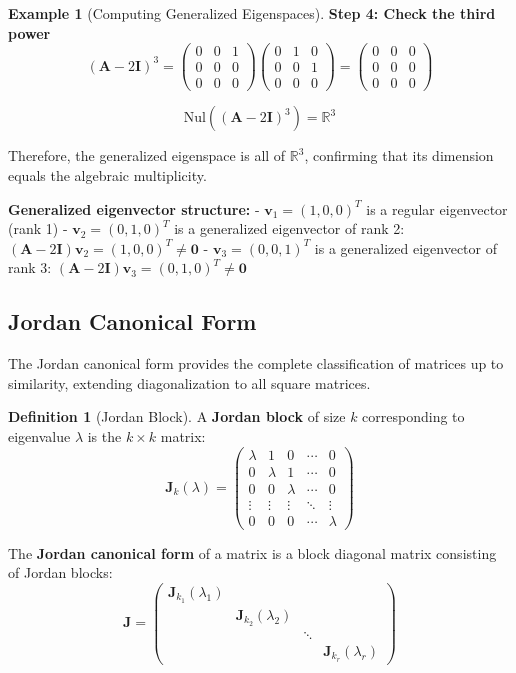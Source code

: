 \documentclass[12pt]{article}
\numberwithin{equation}{section}
\newcommand{\vect}[1]{\boldsymbol{#1}}   %
\newcommand{\mat}[1]{\mathbf{#1}}        %
\theoremstyle{plain}
\theoremstyle{definition}
\newtheorem{definition}[theorem]{Definition}
\newtheorem{example}[theorem]{Example}
\theoremstyle{remark}
\begin{document}
\begin{example}[Computing Generalized Eigenspaces]
\textbf{Step 4: Check the third power}
$$(\mat{A} - 2\mat{I})^3 = \begin{pmatrix} 0 & 0 & 1 \\ 0 & 0 & 0 \\ 0 & 0 & 0 \end{pmatrix}\begin{pmatrix} 0 & 1 & 0 \\ 0 & 0 & 1 \\ 0 & 0 & 0 \end{pmatrix} = \begin{pmatrix} 0 & 0 & 0 \\ 0 & 0 & 0 \\ 0 & 0 & 0 \end{pmatrix}$$

$$\text{Nul}((\mat{A} - 2\mat{I})^3) = \mathbb{R}^3$$

Therefore, the generalized eigenspace is all of $\mathbb{R}^3$, confirming that its dimension equals the algebraic multiplicity.

\textbf{Generalized eigenvector structure:}
- $\vect{v}_1 = (1, 0, 0)^T$ is a regular eigenvector (rank 1)
- $\vect{v}_2 = (0, 1, 0)^T$ is a generalized eigenvector of rank 2: $(\mat{A} - 2\mat{I})\vect{v}_2 = (1, 0, 0)^T \neq \vect{0}$
- $\vect{v}_3 = (0, 0, 1)^T$ is a generalized eigenvector of rank 3: $(\mat{A} - 2\mat{I})\vect{v}_3 = (0, 1, 0)^T \neq \vect{0}$
\end{example}

\subsection{Jordan Canonical Form}

The Jordan canonical form provides the complete classification of matrices up to similarity, extending diagonalization to all square matrices.

\begin{definition}[Jordan Block]
A \textbf{Jordan block} of size $k$ corresponding to eigenvalue $\lambda$ is the $k \times k$ matrix:
$$\mat{J}_k(\lambda) = \begin{pmatrix}
\lambda & 1 & 0 & \cdots & 0 \\
0 & \lambda & 1 & \cdots & 0 \\
0 & 0 & \lambda & \cdots & 0 \\
\vdots & \vdots & \vdots & \ddots & \vdots \\
0 & 0 & 0 & \cdots & \lambda
\end{pmatrix}$$

The \textbf{Jordan canonical form} of a matrix is a block diagonal matrix consisting of Jordan blocks:
$$\mat{J} = \begin{pmatrix}
\mat{J}_{k_1}(\lambda_1) & & & \\
& \mat{J}_{k_2}(\lambda_2) & & \\
& & \ddots & \\
& & & \mat{J}_{k_r}(\lambda_r)
\end{pmatrix}$$
\end{definition}
\end{document}
